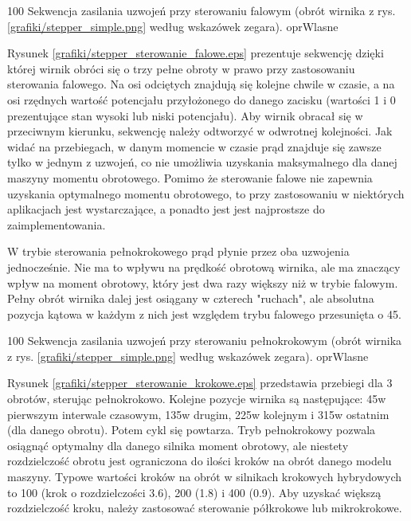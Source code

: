 		{100}
		{Sekwencja zasilania uzwojeń przy sterowaniu falowym (obrót wirnika z rys. \ref{grafiki/stepper_simple.png} według wskazówek zegara).}
		{oprWlasne}

Rysunek \ref{grafiki/stepper_sterowanie_falowe.eps} prezentuje sekwencję dzięki której wirnik obróci się o trzy pełne obroty w prawo przy zastosowaniu sterowania falowego. Na osi odciętych znajdują się kolejne chwile w czasie, a na osi rzędnych wartość potencjału przyłożonego do danego zacisku (wartości 1 i 0 prezentujące stan wysoki lub niski potencjału). Aby wirnik obracał się w przeciwnym kierunku, sekwencję należy odtworzyć w odwrotnej kolejności. Jak widać na przebiegach, w danym momencie w czasie prąd znajduje się zawsze tylko w jednym z uzwojeń, co nie umożliwia uzyskania maksymalnego dla danej maszyny momentu obrotowego. Pomimo że sterowanie falowe nie zapewnia uzyskania optymalnego momentu obrotowego, to przy zastosowaniu w niektórych aplikacjach jest wystarczające, a ponadto jest jest najprostsze do zaimplementowania.


W trybie sterowania pełnokrokowego prąd płynie przez oba uzwojenia jednocześnie. Nie ma to wpływu na prędkość obrotową wirnika, ale ma znaczący wpływ na moment obrotowy, który jest dwa razy większy niż w trybie falowym. Pełny obrót wirnika dalej jest osiągany w czterech "ruchach", ale absolutna pozycja kątowa w każdym z nich jest względem trybu falowego przesunięta o 45\degree.

		{100}
		{Sekwencja zasilania uzwojeń przy sterowaniu pełnokrokowym (obrót wirnika z rys. \ref{grafiki/stepper_simple.png} według wskazówek zegara).}
		{oprWlasne}
		
Rysunek \ref{grafiki/stepper_sterowanie_krokowe.eps} przedstawia przebiegi dla 3 obrotów, sterując pełnokrokowo. Kolejne pozycje wirnika są następujące: 45\degree w pierwszym interwale czasowym, 135\degree w drugim, 225\degree w kolejnym i 315\degree w ostatnim (dla danego obrotu). Potem cykl się powtarza. Tryb pełnokrokowy pozwala osiągnąć optymalny dla danego silnika moment obrotowy, ale niestety rozdzielczość obrotu jest ograniczona do ilości kroków na obrót danego modelu maszyny. Typowe wartości kroków na obrót w silnikach krokowych hybrydowych to 100 (krok o rozdzielczości 3.6\degree), 200 (1.8\degree) i 400 (0.9\degree). Aby uzyskać większą rozdzielczość kroku, należy zastosować sterowanie półkrokowe lub mikrokrokowe.

